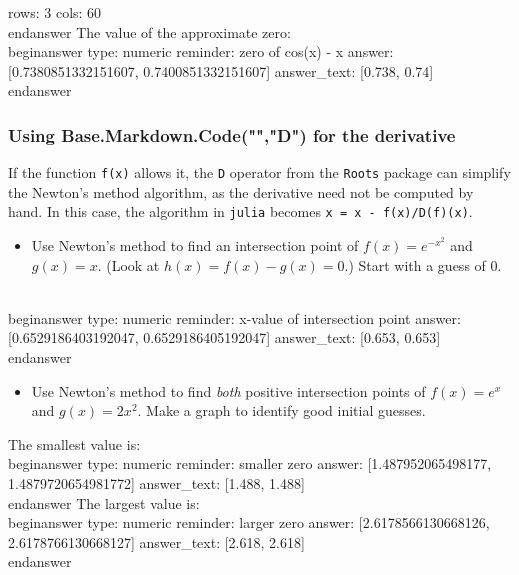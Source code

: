 \documentclass[12pt]{article}
\begin{document}
rows: 3
cols: 60
\\end{answer}
\newline
The value of the approximate zero:
\\begin{answer}
    type: numeric
    reminder: zero of cos(x) - x
    answer: [0.7380851332151607, 0.7400851332151607]
    answer_text: [0.738, 0.74] 
\\end{answer}
\subsubsection{Using Base.Markdown.Code("","D") for the derivative}\newline
If the function \texttt{f(x)} allows it, the \texttt{D} operator from the \texttt{Roots} package can simplify the Newton's method algorithm, as the derivative need not be computed by hand. In this case, the algorithm in \texttt{julia} becomes \texttt{x = x - f(x)/D(f)(x)}.\begin{itemize}\item Use Newton's method to find an intersection point of $f(x) =   e^{-x^2}$ and $g(x)=x$. (Look at $h(x) = f(x) - g(x) = 0$.) Start   with a guess of $0$.\end{itemize}
\\begin{answer}
    type: numeric
    reminder: x-value of intersection point
    answer: [0.6529186403192047, 0.6529186405192047]
    answer_text: [0.653, 0.653] 
\\end{answer}
\begin{itemize}\item Use Newton's method to find \textit{both} positive intersection points of   $f(x) = e^x$ and $g(x) = 2x^2$. Make a graph to identify good   initial guesses.\end{itemize}\newline
The smallest value is:
\\begin{answer}
    type: numeric
    reminder: smaller zero
    answer: [1.487952065498177, 1.4879720654981772]
    answer_text: [1.488, 1.488] 
\\end{answer}
\newline
The largest value is:
\\begin{answer}
    type: numeric
    reminder: larger zero
    answer: [2.6178566130668126, 2.6178766130668127]
    answer_text: [2.618, 2.618] 
\\end{answer}
\end{document}
